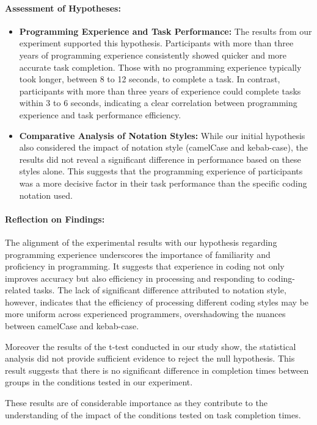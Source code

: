 \documentclass{article}
\begin{document}
\paragraph{Assessment of Hypotheses:}
\begin{itemize}
    \item \textbf{Programming Experience and Task Performance:} The results from our experiment supported this hypothesis. Participants with more than three years of programming experience consistently showed quicker and more accurate task completion. Those with no programming experience typically took longer, between 8 to 12 seconds, to complete a task. In contrast, participants with more than three years of experience could complete tasks within 3 to 6 seconds, indicating a clear correlation between programming experience and task performance efficiency.
    
    \item \textbf{Comparative Analysis of Notation Styles:} While our initial hypothesis also considered the impact of notation style (camelCase and kebab-case), the results did not reveal a significant difference in performance based on these styles alone. This suggests that the programming experience of participants was a more decisive factor in their task performance than the specific coding notation used.
\end{itemize}

\paragraph{Reflection on Findings:}
The alignment of the experimental results with our hypothesis regarding programming experience underscores the importance of familiarity and proficiency in programming. It suggests that experience in coding not only improves accuracy but also efficiency in processing and responding to coding-related tasks. The lack of significant difference attributed to notation style, however, indicates that the efficiency of processing different coding styles may be more uniform across experienced programmers, overshadowing the nuances between camelCase and kebab-case.


Moreover the results of the t-test conducted in our study show, the statistical analysis did not provide sufficient evidence to reject the null hypothesis. This result suggests that there is no significant difference in completion times between groups in the conditions tested in our experiment.

These results are of considerable importance as they contribute to the understanding of the impact of the conditions tested on task completion times. 
\end{document}
